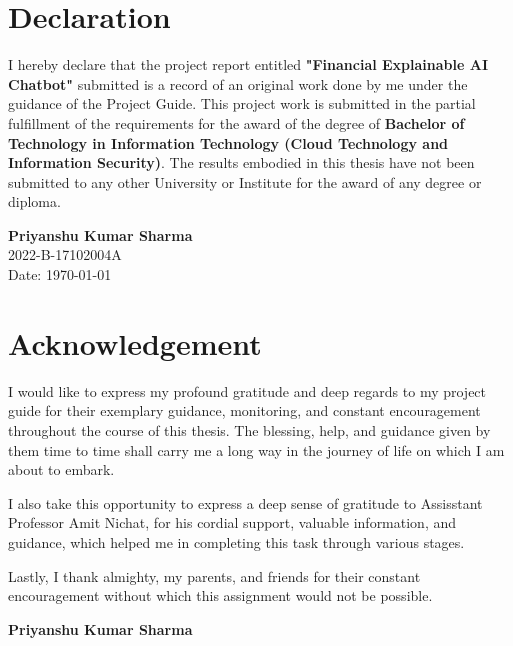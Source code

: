\documentclass[12pt,a4paper]{report}
\begin{document}
\chapter*{Declaration}
I hereby declare that the project report entitled \textbf{"Financial Explainable AI Chatbot"} submitted is a record of an original work done by me under the guidance of the Project Guide. This project work is submitted in the partial fulfillment of the requirements for the award of the degree of \textbf{Bachelor of Technology in Information Technology (Cloud Technology and Information Security)}. The results embodied in this thesis have not been submitted to any other University or Institute for the award of any degree or diploma.

\vspace{3cm}

\begin{flushright}
    \textbf{Priyanshu Kumar Sharma} \\
    2022-B-17102004A \\
    Date: \today
\end{flushright}
\pagebreak

\chapter*{Acknowledgement}
I would like to express my profound gratitude and deep regards to my project guide for their exemplary guidance, monitoring, and constant encouragement throughout the course of this thesis. The blessing, help, and guidance given by them time to time shall carry me a long way in the journey of life on which I am about to embark.

I also take this opportunity to express a deep sense of gratitude to Assisstant Professor Amit Nichat, for his   cordial support, valuable information, and guidance, which helped me in completing this task through various stages.

Lastly, I thank almighty, my parents, and friends for their constant encouragement without which this assignment would not be possible.

\vspace{2cm}

\begin{flushright}
    \textbf{Priyanshu Kumar Sharma}
\end{flushright}
\pagebreak
\end{document}
